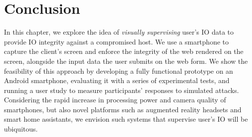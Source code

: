 \section{Conclusion} 
\label{integriscreen:sec:conclusion}

In this chapter, we explore the idea of \emph{visually supervising} user's IO data to provide IO integrity against a compromised host. We use a smartphone to capture the client's screen and enforce the integrity of the web rendered on the screen, alongside the input data the user submits on the web form. We show the feasibility of this approach by developing a fully functional prototype on an Android smartphone, evaluating it with a series of experimental tests, and running a user study to measure participants' responses to simulated attacks.
Considering the rapid increase in processing power and camera quality of smartphones, but also novel platforms such as augmented reality headsets and smart home assistants, we envision such systems that supervise user's IO will be ubiquitous.